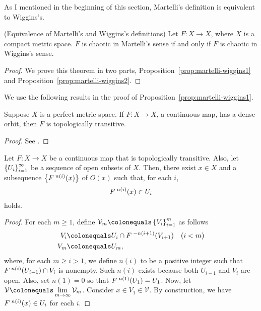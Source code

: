 \documentclass[10pt,draft,twoside]{book}
\begin{document}
As I mentioned in the beginning of this section, Martelli's definition is equivalent to Wiggins's.
\begin{theorem}
  (Equivalence of Martelli's and Wiggins's definitions)
  Let $F: X \to X$, where $X$ is a compact metric space.
  $F$ is chaotic in Martelli's sense if and only if $F$ is chaotic in Wiggins's sense.
  \label{thm:martelli-wiggins}
  \begin{proof}
    We prove this theorem in two parts, Proposition~\ref{prop:martelli-wiggins1} and Proposition~\ref{prop:martelli-wiggins2}.
  \end{proof}
\end{theorem}
We use the following results in the proof of Proposition~\ref{prop:martelli-wiggins1}.
\begin{proposition}
  \citep{silverman}
  Suppose $X$ is a perfect metric space.
  If $F: X\to X$, a continuous map, has a dense orbit, then $F$ is topologically transitive.
  \begin{proof}
    See \citep{silverman}.
  \end{proof}
  \label{prop:dob-transitivity}
\end{proposition}
\begin{proposition}
  Let $F: X \to X$ be a continuous map that is topologically transitive.
  Also, let $\left \{ U_i \right \}^{\infty}_{i=1}$ be a sequence of open subsets of $X$.
  Then, there exist $x \in X$ and a subsequence $\left \{ F^{\;n(i)}(x) \right \}$ of $O(x)$ such that, for each $i$,
  \begin{equation*}
    F^{\;n(i)}(x) \in U_i
  \end{equation*}
  holds.
  \label{prop:transitivity}
  \begin{proof}
    For each $m \geq 1$, define $\mathcal{V}_m \ceq \seq{V_i}{m}{i=1}$ as follows
    \begin{align*}
      V_i &\ceq U_{i} \cap \itr{F}{-n(i+1)} (V_{i+1}) \quad (i < m) \\
      V_m &\ceq U_m,
    \end{align*}
    where, for each $m \geq i > 1$, we define $n(i)$ to be a positive integer such that $F^{\;n(i)}(U_{i-1}) \cap V_i$ is nonempty.
    Such $n(i)$ exists because both $U_{i-1}$ and $V_i$ are open.
    Also, set $n(1) = 0$ so that $F^{\;n(1)}(U_1) = U_1$.
    Now, let $\mathcal{V} \ceq \lim\limits_{m \to \infty} \mathcal{V}_m$.
    Consider $x \in V_1 \in \mathcal{V}$.
    By construction, we have $F^{\;n(i)}(x) \in U_i$ for each $i$.
  \end{proof}
\end{proposition}
\end{document}
